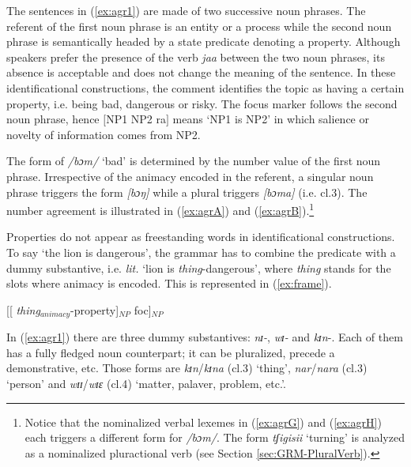 \begin{exe}
\begin{exe}
\begin{exe}
{\begin{exe}
\begin{exe}
\begin{exe}
\begin{exe}
\begin{exe}
\begin{exe}
\begin{exe}
\begin{xlist}
\begin{exe}
\begin{exe}
\begin{exe}
\begin{exe}
\begin{exe}
\begin{exe}
\begin{exe}
\begin{exe}
\begin{exe}
\begin{exe}
\begin{exe}
\begin{exe}
\begin{exe}
\z 
 \z

The sentences in (\ref{ex:agr1})  are made of two successive noun phrases. The
referent of the first
noun phrase is an entity or a process while the second noun phrase is
semantically headed by a state predicate denoting a property.  Although
speakers prefer the presence of   the  verb {\it jaa} between the two
noun phrases, its  absence is acceptable and does not change the meaning of the
sentence. In these  identificational constructions,  the comment identifies the
topic as having a certain property, i.e. being bad, dangerous or risky. The 
focus marker follows the second noun
phrase, hence  $[$NP1 NP2 ra$]$  means `NP1 is NP2' in which salience or novelty
of information comes from NP2. 


The form of  {\it /bɔm/}   `bad' is determined
by the number value of the first noun phrase. Irrespective of the animacy
encoded in the referent, a  singular noun phrase triggers
the form {\it [bɔŋ]} while a plural triggers {\it [bɔma]} (i.e. {\sc cl.3}).  
The
number
agreement is illustrated in (\ref{ex:agrA}) and
(\ref{ex:agrB}).\footnote{Notice that the nominalized verbal lexemes in
(\ref{ex:agrG}) and (\ref{ex:agrH}) each triggers a different form for 
{\it /bɔm/}. The  form  {\it tʃigisii}  `turning'  is analyzed as a nominalized
pluractional
verb (see Section \ref{sec:GRM-PluralVerb}).}  

Properties do not appear as  
freestanding words in
identificational constructions. To say `the lion is dangerous', the grammar
has to combine the predicate with a dummy substantive, i.e. {\it lit.}  `lion is
{\it
thing}-dangerous',  where {\it thing} stands for the slots where animacy is
encoded. This is represented in (\ref{ex:frame}).  


\ea\label{ex:frame}
 [[ {\it thing}$_{animacy}$-property]$_{NP}$ {\sc foc}]$_{NP}$
\z


In  (\ref{ex:agr1}) there are three dummy substantives:   {\it  nɪ-}, {\it  wɪ-}
and  {\it  kɪn}-.  Each of them has a fully fledged noun counterpart; it can be
pluralized, precede a demonstrative, etc. Those forms are 
{\it 
kɪn}/{\it  kɪna} ({\sc cl.3})  `thing',  {\it  nar}/{\it  nara} ({\sc cl.3})
`person' and {\it 
 wɪɪ}/{\it  wɪɛ} ({\sc cl.4}) `matter, palaver, problem, etc.'.  


\begin{table}[htb!]


\end{table}
\end{exe}
\end{exe}
\end{exe}
\end{exe}
\end{exe}
\end{exe}
\end{exe}
\end{exe}
\end{exe}
\end{exe}
\end{exe}
\end{exe}
\end{exe}
\end{xlist}
\end{exe}
\end{exe}
\end{exe}
\end{exe}
\end{exe}
\end{exe}
\end{exe}}
\end{exe}
\end{exe}
\end{exe}
